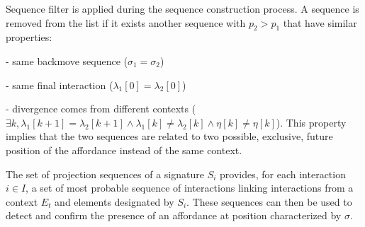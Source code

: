 \documentclass[conference]{IEEEtran}
\begin{document}
Sequence filter is applied during the sequence construction process. A sequence is removed from the list if it exists another sequence with $p_2>p_1$ that have similar properties:

- same backmove sequence ($\sigma_1=\sigma_2$)

- same final interaction ($\lambda_1[0]=\lambda_2[0]$)

- divergence comes from different contexts ($\exists k, \lambda_1[k+1]=\lambda_2[k+1] \wedge \lambda_1[k] \neq \lambda_2[k] \wedge \eta[k] \neq\eta[k]$). This property implies that the two sequences are related to two possible, exclusive, future position of the affordance instead of the same context.

The set of projection sequences of a signature $S_i$ provides, for each interaction $i \in I$, a set of most probable sequence of interactions linking interactions from a context $E_t$ and elements designated by $S_i$. These sequences can then be used to detect and confirm the presence of an affordance at position characterized by $\sigma$.














\end{document}
